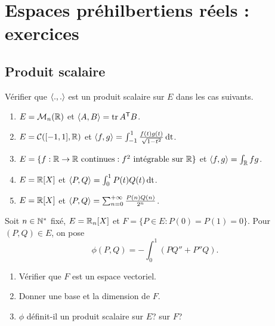 \documentclass{book}
\begin{document}
\chapter*{Espaces préhilbertiens réels : exercices}
\section{Produit scalaire}
 \begin{Exercice}[*]

Vérifier que $\langle.,.\rangle$ est un produit scalaire sur $E$ dans les cas suivants.
\begin{enumerate}
\item $E = \mathcal{M}_{n}(\mathbb{R})$
  et $\langle A,B\rangle = \operatorname{tr}{ A^{\mathsf {T}}B}$.\\
\item $E = \mathcal{C}([-1,1],\mathbb{R})$
  et $\langle f,g\rangle = \int_{-1}^1 \frac{f(t)g(t)}{\sqrt{1-t^2}}\,\mathrm{dt}$.
\item $E = \{f:\mathbb{R}\to \mathbb{R}\text{ continues}: f^2 \text{ intégrable sur }\mathbb{R}\}$
  et $\langle f,g\rangle = \int_{\mathbb{R}} fg$.
\item $E = \mathbb{R}[X]$
  et $ \langle P,Q\rangle =\int_0^1 P(t)Q(t)\,\mathrm{dt}$.
\item $E = \mathbb{R}[X]$
  et $\langle P,Q\rangle =\sum_{n=0}^{+\infty} \frac{P(n)Q(n)}{2^n}$.
\end{enumerate}
\end{Exercice}
 \begin{Exercice}[*]

Soit $n\in\mathbb{N}^*$ fixé, $E = \mathbb{R}_n[X]$ et $F = \{P\in E :P(0)=P(1)=0\}$.
Pour $(P,Q)\in E$, on pose \[ \phi(P,Q) = -\int_0^1 (PQ''+P''Q). \]
\begin{enumerate}
\item Vérifier que $F$ est un espace vectoriel.
\item Donner une base et la dimension de $F$.
\item $\phi$ définit-il un produit scalaire sur $E$? sur $F$?
\end{enumerate}
\end{Exercice}
\end{document}
